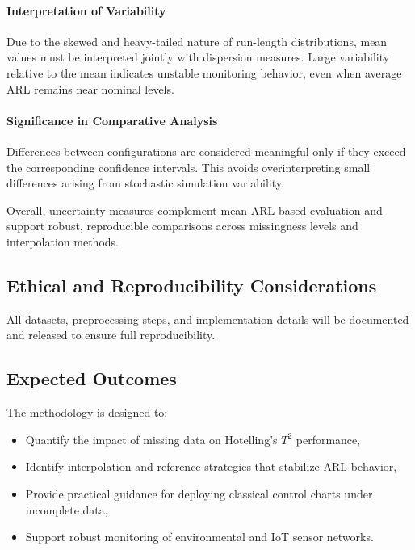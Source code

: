 \paragraph{Interpretation of Variability}
Due to the skewed and heavy-tailed nature of run-length distributions, mean values
must be interpreted jointly with dispersion measures. Large variability relative to
the mean indicates unstable monitoring behavior, even when average \ac{ARL} remains
near nominal levels.

\paragraph{Significance in Comparative Analysis}
Differences between configurations are considered meaningful only if they exceed
the corresponding confidence intervals. This avoids overinterpreting small differences
arising from stochastic simulation variability.

Overall, uncertainty measures complement mean \ac{ARL}-based evaluation and support
robust, reproducible comparisons across missingness levels and interpolation methods.

\subsection{Ethical and Reproducibility Considerations}

All datasets, preprocessing steps, and implementation details will be documented and released to ensure full reproducibility.

\subsection{Expected Outcomes}

The methodology is designed to:
\begin{itemize}
\item Quantify the impact of missing data on Hotelling’s $T^2$ performance,
\item Identify interpolation and reference strategies that stabilize \ac{ARL} behavior,
\item Provide practical guidance for deploying classical control charts under incomplete data,
\item Support robust monitoring of environmental and \ac{IoT} sensor networks.
\end{itemize}
